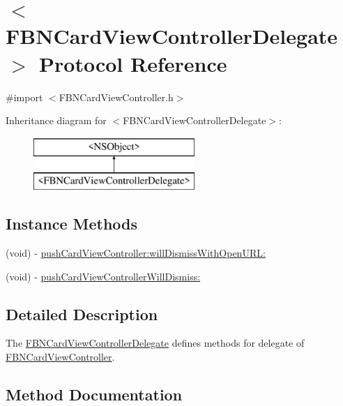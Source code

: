 \hypertarget{protocol_f_b_n_card_view_controller_delegate-p}{}\section{$<$F\+B\+N\+Card\+View\+Controller\+Delegate$>$ Protocol Reference}
\label{protocol_f_b_n_card_view_controller_delegate-p}


{\ttfamily \#import $<$F\+B\+N\+Card\+View\+Controller.\+h$>$}

Inheritance diagram for $<$F\+B\+N\+Card\+View\+Controller\+Delegate$>$\+:\begin{figure}[H]
\begin{center}
\leavevmode
\includegraphics[height=2.000000cm]{protocol_f_b_n_card_view_controller_delegate-p}
\end{center}
\end{figure}
\subsection*{Instance Methods}
\begin{DoxyCompactItemize}
\item 
(void) -\/ \hyperlink{protocol_f_b_n_card_view_controller_delegate-p_aa06876ddfecc0d59fbccb3544e211975}{push\+Card\+View\+Controller\+:will\+Dismiss\+With\+Open\+U\+R\+L\+:}
\item 
(void) -\/ \hyperlink{protocol_f_b_n_card_view_controller_delegate-p_a04baebc794cfdd634b927f9272684945}{push\+Card\+View\+Controller\+Will\+Dismiss\+:}
\end{DoxyCompactItemize}


\subsection{Detailed Description}
The {\ttfamily \hyperlink{protocol_f_b_n_card_view_controller_delegate-p}{F\+B\+N\+Card\+View\+Controller\+Delegate}} defines methods for delegate of {\ttfamily \hyperlink{interface_f_b_n_card_view_controller}{F\+B\+N\+Card\+View\+Controller}}. 

\subsection{Method Documentation}
\hypertarget{protocol_f_b_n_card_view_controller_delegate-p_aa06876ddfecc0d59fbccb3544e211975}{}
